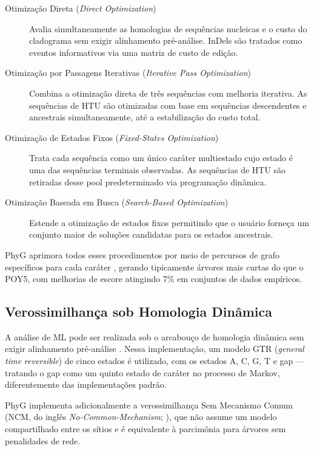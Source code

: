 \begin{description}
    \item[Otimização Direta (\textit{Direct Optimization})] \parencite{wheeler1996} Avalia simultaneamente as homologias de sequências nucleicas e o custo do cladograma sem exigir alinhamento pré-análise. InDels são tratados como eventos informativos via uma matriz de custo de edição.

    \item[Otimização por Passagens Iterativas (\textit{Iterative Pass Optimization})] \parencite{wheeler2003b} Combina a otimização direta de três sequências com melhoria iterativa. As sequências de HTU são otimizadas com base em sequências descendentes e ancestrais simultaneamente, até a estabilização do custo total.

    \item[Otimização de Estados Fixos (\textit{Fixed-States Optimization})] \parencite{wheeler1999a} Trata cada sequência como um único caráter multiestado cujo estado é uma das sequências terminais observadas. As sequências de HTU são retiradas desse pool predeterminado via programação dinâmica.

    \item[Otimização Baseada em Busca (\textit{Search-Based Optimization})] \parencite{wheeler2003c} Estende a otimização de estados fixos permitindo que o usuário forneça um conjunto maior de soluções candidatas para os estados ancestrais.
\end{description}

PhyG \parencite{wheeleretal2024} aprimora todos esses procedimentos por meio de percursos de grafo específicos para cada caráter \parencite{varonwheeler2012}, gerando tipicamente árvores mais curtas do que o POY5, com melhorias de escore atingindo 7\% em conjuntos de dados empíricos.

\subsection{Verossimilhança sob Homologia Dinâmica}

A análise de ML pode ser realizada sob o arcabouço de homologia dinâmica sem exigir alinhamento pré-análise \parencite{wheeleretal2006}. Nessa implementação, um modelo GTR (\textit{general time reversible}) de cinco estados é utilizado, com os estados A, C, G, T e gap --- tratando o gap como um quinto estado de caráter no processo de Markov, diferentemente das implementações padrão.

PhyG \parencite{wheeleretal2024} implementa adicionalmente a verossimilhança Sem Mecanismo Comum (NCM, do inglês \textit{No-Common-Mechanism}; \cite{tuffleysteel1997}), que não assume um modelo compartilhado entre os sítios e é equivalente à parcimônia para árvores sem penalidades de rede.

